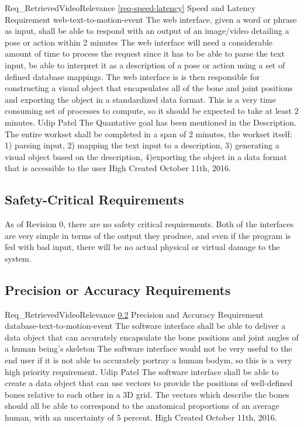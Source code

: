 \documentclass{scrreprt}
\begin{document}
\requirement
{Req_RetrievedVideoRelevance}
{\ref{req-speed-latency} Speed and Latency Requirement}
{web-text-to-motion-event}
{The web interface, given a word or phrase as input, shall be able to respond with an output of an image/video detailing a pose or action within 2 minutes}
{The web interface will need a considerable amount of time to process the request since it has to be able to parse the text input, be able to interpret it as a description of a pose or action using a set of defined database mappings. The web interface is is then responsible for constructing a visual object that encapsulates all of the bone and joint positions and exporting the object in a standardized data format. This is a very time consuming set of processes to compute, so it should be expected to take at least 2 minutes.}
{Udip Patel}
{The Quantative goal has been mentioned in the Description. The entire workset shall be completed in a span of 2 minutes, the workset itself: 1) parsing input, 2) mapping the text input to a description, 3) generating a visual object based on the description, 4)exporting the object in a data format that is accessible to the user }
{High}
{Created October 11th, 2016.}

\subsection{Safety-Critical Requirements}
\label{req-safety-critical}
As of Revision 0, there are no safety critical requirements. Both of the interfaces are very simple in terms of the output they produce, and even if the program is fed with bad input, there will be no actual physical or virtual damage to the system.

\subsection{Precision or Accuracy Requirements}
\label{req-precision-accuracy}
\requirement
{Req_RetrievedVideoRelevance}
{\ref{req-precision-accuracy} Precision and Accuracy Requirement}
{database-text-to-motion-event}
{The software interface shall be able to deliver a data object that can accurately encapsulate the bone positions and joint angles of a human being's skeleton}
{The software interface would not be very useful to the end user if it is not able to accurately portray a human bodym, so this is a very high priority requirement.}
{Udip Patel}
{The software interface shall be able to create a data object that can use vectors to provide the positions of well-defined bones relative to each other in a 3D grid. The vectors which describe the bones should all be able to correspond to the anatomical proportions of an average human, with an uncertainty of 5 percent.}
{High}
{Created October 11th, 2016.}
\end{document}
